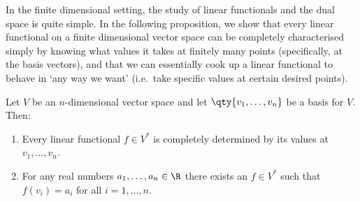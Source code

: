 In the finite dimensional setting, the study of linear functionals and the dual space is quite simple. In the following proposition, we show that every linear functional on a finite dimensional vector space can be completely characterised simply by knowing what values it takes at finitely many points (specifically, at the basis vectors), and that we can essentially cook up a linear functional to behave in `any way we want' (i.e.\ take specific values at certain desired points).
  \begin{proposition}
    \label{thm:dualprops}
  Let \( V \) be an \( n \)-dimensional vector space and let \( \qty{v_1,\dots,v_n} \) be a basis for \( V \). Then: 
  \begin{enumerate}[label=(\alph*)]
  \item Every linear functional \( f\in V^* \) is completely determined by its values at \( v_1,\dots,v_n \).
  \item For any real numbers \( a_1,\dots, a_n\in\R \) there exists an \( f\in V^* \) such that \( f(v_i)=a_i \) for all \( i=1,\dots,n \).
  \end{enumerate}
\end{proposition}

